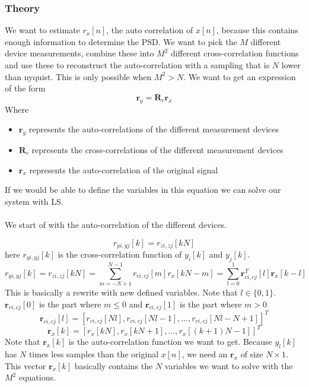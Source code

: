 \documentclass[report, oneside, a4paper, openany]{memoir}
\begin{document}
\subsubsection{Theory}
We want to estimate $r_x[n]$, the auto correlation of $x[n]$, because this contains enough information to determine the PSD.
We want to pick the $M$ different device measurements, combine these into $M^2$ different cross-correlation functions and use these to reconstruct the auto-correlation with a sampling that is $N$ lower than nyquist. 
This is only possible when $M^2>N$. We want to get an expression of the form
$$
\mathbf{r}_y = \mathbf{R}_c\mathbf{r}_x
$$ 
Where
\begin{itemize}
\item $\mathbf{r}_y$ represents the auto-correlations of the different measurement devices
\item $\mathbf{R}_c$ represents the cross-correlations of the different measurement devices 
\item $\mathbf{r}_x$ represents the auto-correlation of the original signal
\end{itemize}
If we would be able to define the variables in this equation we can solve our system with LS.\\
\\
We start of with the auto-correlation of the different devices.

$$
r_{yi,yj}[k] = r_{zi,zj}[kN]
$$
here $r_{yi,yj}[k]$ is the cross-correlation function of $y_i[k]$ and $y_j[k]$.
$$
r_{yi,yj}[k] = r_{zi,zj}[kN] = \sum_{m=-N+1}^{N-1}r_{ci,cj}[m]r_x[kN-m] = \sum_{l=0}^1\mathbf{r}^T_{ci,cj}[l]\mathbf{r}_x[k-l]
$$
This is basically a rewrite with new defined variables. Note that $l \in \{0,1\}$. $\mathbf{r}_{ci,cj}[0]$ is the part where $m\leq 0$ and $\mathbf{r}_{ci,cj}[1]$ is the part where $m > 0$ 
$$
\mathbf{r}_{ci,cj}[l] = [r_{ci,cj}[Nl], r_{ci,cj}[Nl-1], \dots, r_{ci,cj}[Nl-N+1]]^T
$$
$$
\mathbf{r}_x[k]= [r_x[kN],r_x[kN+1],\dots,r_x[(k+1)N-1]]^T
$$
Note that $\mathbf{r}_x[k]$ is the auto-correlation function we want to get. 
Because $y_l[k]$ has $N$ times less samples than the original $x[n]$, we need an $\mathbf{r}_x$ of size $N \times 1$.
This vector $\mathbf{r}_x[k]$ basically contains the $N$ variables we want to solve with the $M^2$ equations.
\end{document}
